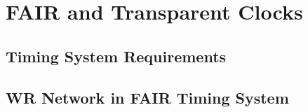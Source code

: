 \section{FAIR and Transparent Clocks}
\label{sec:FAIR}

\subsection{Timing System Requirements}



\subsection{WR Network in FAIR Timing System}
